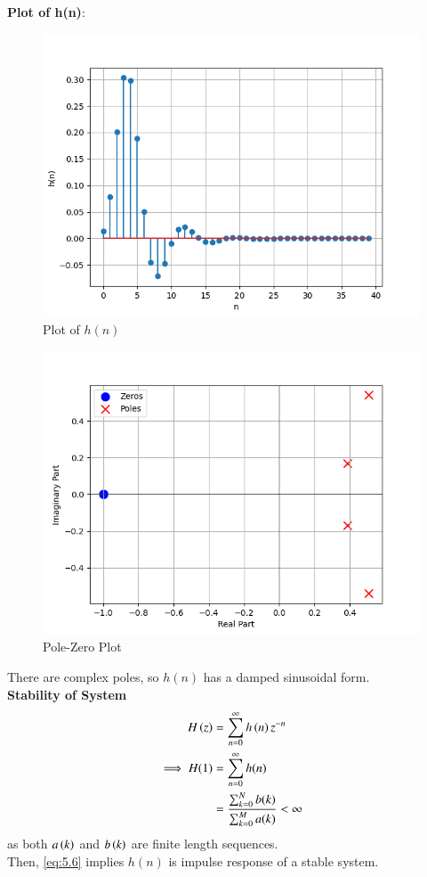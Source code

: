 \documentclass[journal,12pt,twocolumn]{IEEEtran}
\theoremstyle{remark}
\renewcommand\thesection{\arabic{section}}
\numberwithin{equation}{subsection}
\begin{document}
\begin{enumerate}[label=\thesection.\arabic*]
\textbf{Plot of h(n)}:
\begin{figure}[!h]
    \centering
    \includegraphics[width = \columnwidth]{figs/7.2hn.png}
    \caption{Plot of $h(n)$}
    \label{fig:7.2}
\end{figure}
\newpage
\begin{figure}[!h]
    \centering
    \includegraphics[width = \columnwidth]{figs/7.2zp.png}
    \caption{Pole-Zero Plot}
    \label{fig:7.2zp}
\end{figure}
There are complex poles, so $h(n)$ has a damped sinusoidal form.\\

\textbf{Stability of System}
\begin{align}
H\left(z\right) &= \sum_{n = 0}^{\infty} h\left(n\right)z^{-n}\\
\implies H(1)&= \sum_{n = 0}^{\infty}h(n) \\
&= \frac{\sum_{k = 0}^{N}b(k)}{\sum_{k = 0}^{M}a(k)}< \infty
\end{align}
as both $a\left(k\right)$ and $b\left(k\right)$ are finite length sequences.\\
Then, \eqref{eq:5.6} implies $h(n)$ is impulse response of a stable system.
\\


\end{enumerate}
\end{document}

